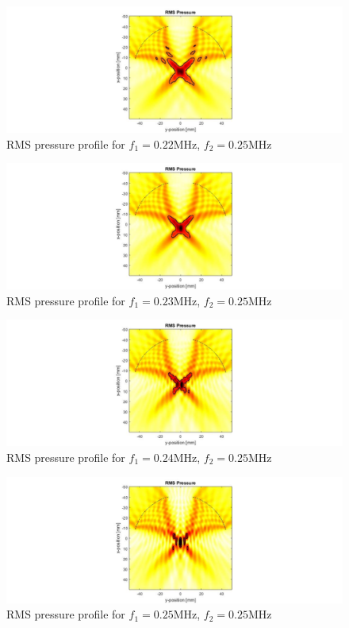 \documentclass[10pt,a4paper]{article}
\begin{document}
\begin{figure}[!h]
\hspace*{-5cm}                                                    
\includegraphics[scale=0.6]{f220kHz}
\caption{RMS pressure profile for $f_1 = 0.22$MHz, $f_2 = 0.25$MHz}
\end{figure}
\begin{figure}[!h]
\hspace*{-5cm}                                                    
\includegraphics[scale=0.6]{f230kHz}
\caption{RMS pressure profile for $f_1 = 0.23$MHz, $f_2 = 0.25$MHz}
\end{figure}
\begin{figure}[!h]
\hspace*{-5cm}                                                    
\includegraphics[scale=0.6]{f240kHz}
\caption{RMS pressure profile for $f_1 = 0.24$MHz, $f_2 = 0.25$MHz}
\end{figure}
\begin{figure}[!h]
\hspace*{-5cm}                                                    
\includegraphics[scale=0.6]{f250kHz}
\caption{RMS pressure profile for $f_1 = 0.25$MHz, $f_2 = 0.25$MHz}
\end{figure}
\end{document}
